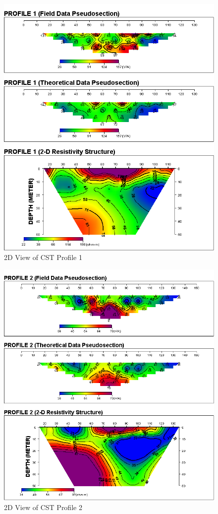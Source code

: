 \documentclass[12pt,a4paper]{report}
\begin{document}
\begin{figure}[H]
    \centering
    \includegraphics[width=1.0\textwidth]{PROFILE 1D.png}
    \caption{2D View of CST Profile 1}
    \label{fig:UI_CST_1_Curve}
\end{figure}

\begin{figure}[H]
    \centering
    \includegraphics[width=1.0\textwidth]{PROFILE 2D.png}
    \caption{2D View of CST Profile 2}
    \label{fig:UI_CST_2_Curve}
\end{figure}
\end{document}
